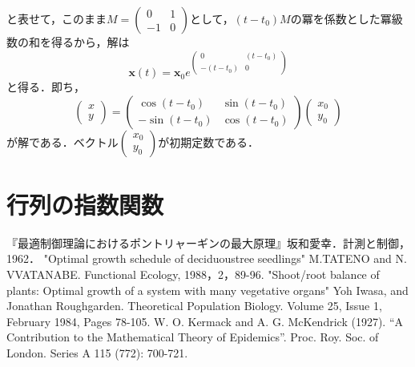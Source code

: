 \documentclass[uplatex,dvipdfmx]{jsreport}
\begin{document}
と表せて，このまま$M=\left(\begin{array}{cc} 0 & 1\\-1 &0 \end{array}\right)$として，$(t-t_0)M$の冪を係数とした冪級数の和を得るから，解は
\begin{equation}
    \mathbf{x}(t) = \mathbf{x}_0e^{\left(\begin{array}{cc} 0 & (t-t_0)\\-(t-t_0) &0 \end{array}\right)}
\end{equation}
と得る．即ち，
\begin{equation}
\left(\begin{array}{c} x\\ y \end{array}\right) = \left(\begin{array}{cc} \cos(t-t_0) & \sin(t-t_0)\\-\sin(t-t_0) &\cos(t-t_0) \end{array}\right)\left(\begin{array}{c} x_0 \\ y_0 \end{array}\right)
\end{equation}
が解である．ベクトル$\left(\begin{array}{c} x_0 \\ y_0 \end{array}\right)$が初期定数である．

\section{行列の指数関数}

\begin{thebibliography}{99}
    『最適制御理論におけるポントリャーギンの最大原理』坂和愛幸．計測と制御，1962．
    "Optimal growth schedule of deciduoustree seedlings" M.TATENO and N. VVATANABE. Functional Ecology, 1988，2，89-96.
    "Shoot/root balance of plants: Optimal growth of a system with many vegetative organs" Yoh Iwasa, and Jonathan Roughgarden. 
    Theoretical Population Biology. Volume 25, Issue 1, February 1984, Pages 78-105. 
    W. O. Kermack and A. G. McKendrick (1927). “A Contribution to the Mathematical Theory of Epidemics”. Proc. Roy. Soc. of London. Series A 115 (772): 700-721.
\end{thebibliography}
\end{document}

